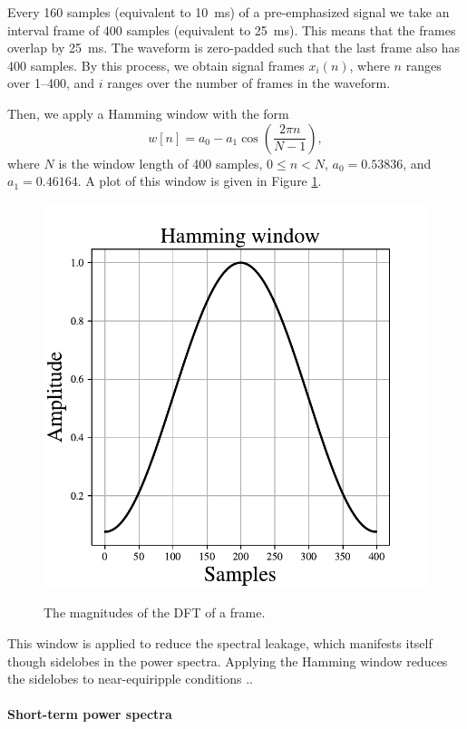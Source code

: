			Every 160 samples (equivalent to \SI{10}{ms}) of a pre-emphasized signal we take an interval frame of 400 samples (equivalent to \SI{25}{ms}).
			This means that the frames overlap by \SI{25}{ms}.
			The waveform is zero-padded such that the last frame also has 400 samples.
			By this process, we obtain signal frames $x_i(n)$, where $n$ ranges over 1--400, and $i$ ranges over the number of frames in the waveform.

			Then, we apply a Hamming window with the form
			\begin{equation}
				w\left[n\right] = a_0 - a_1\cos\left(\frac{2\pi n}{N-1}\right),
			\end{equation}
			where $N$ is the window length of 400 samples, $0 \leq n < N$, $a_0 = 0.53836$, and $a_1 = 0.46164$.
			A plot of this window is given in Figure \ref{fig:hamming}.
			\begin{figure}[ht]
				\centering
			    \includegraphics[width=.45\linewidth]{gfx/hamming}
			    \label{fig:hamming}
			    \caption{The magnitudes of the DFT of a frame.}
			\end{figure}
			This window is applied to reduce the spectral leakage, which manifests itself though sidelobes in the power spectra.
			Applying the Hamming window reduces the sidelobes to near-equiripple conditions \citep{SASPWEB2011}..

		\paragraph{Short-term power spectra}

